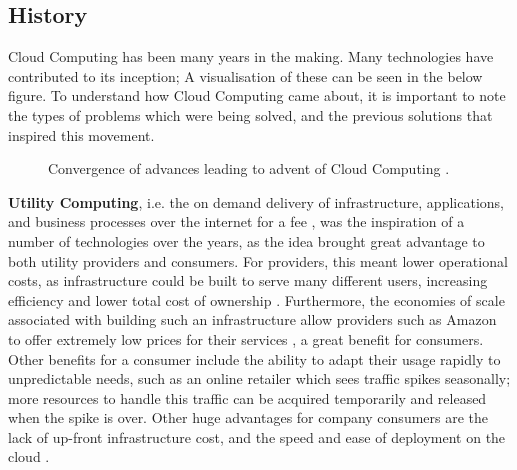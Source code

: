 \subsection{History}
Cloud Computing has been many years in the making. Many technologies have contributed to its inception; A visualisation of these can be seen in the below figure. To understand how Cloud Computing came about, it is important to note the types of problems which were being solved, and the previous solutions that inspired this movement. 
 
\begin{figure}[ht]
\centering
{}
\caption[An example figure.]{Convergence of advances leading to advent of Cloud Computing \cite{principlesparadigms}.}
\end{figure}

\textbf{Utility Computing}, i.e. the on demand delivery of infrastructure, applications, and business processes over the internet for a fee \cite{utilitybusinessmodel}, was the inspiration of a number of technologies over the years, as the idea brought great advantage to both utility providers and consumers. For providers, this meant lower operational costs, as infrastructure could be built to serve many different users, increasing efficiency and lower total cost of ownership \cite{utilityglobalgrids}. Furthermore, the economies of scale associated with building such an infrastructure allow providers such as Amazon to offer extremely low prices for their services \cite{amazonwhatiscloudcomputing}, a great benefit for consumers.  Other benefits for a consumer include the ability to adapt their usage rapidly to unpredictable needs, such as an online retailer which sees traffic spikes seasonally; more resources to handle this traffic can be acquired temporarily and released when the spike is over. Other huge advantages for company consumers are the lack of up-front infrastructure cost, and the speed and ease of deployment on the cloud \cite{amazonwhatiscloudcomputing}.    

